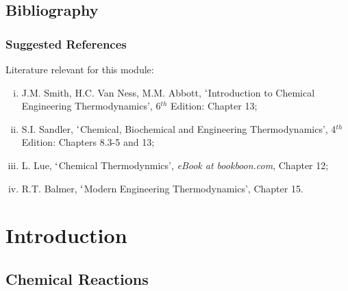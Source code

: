 \documentclass[10pt,compress,unknownkeysallowed]{beamer}
\begin{document}
\subsection{Bibliography}
\begin{frame}
 \frametitle{Suggested References}
  Literature relevant for this module:
  \begin{enumerate}[(i)]
   \item\label{SVN_Book} J.M. Smith, H.C. Van Ness, M.M. Abbott, $\lq$Introduction to Chemical Engineering Thermodynamics', 6$^{th}$ Edition: Chapter 13;
   \item\label{Sandle_Book} S.I. Sandler, $\lq$Chemical, Biochemical and Engineering Thermodynamics', 4$^{th}$ Edition: Chapters 8.3-5 and 13;
   \item\label{Lue_Book} L. Lue, $\lq$Chemical Thermodynmics', {\it eBook at bookboon.com}, Chapter 12;
   \item\label{Balmer_Book}R.T. Balmer, $\lq$Modern Engineering Thermodynamics', Chapter 15.
  \end{enumerate}
\end{frame}


\section{Introduction}

\subsection{Chemical Reactions}
\end{document}
